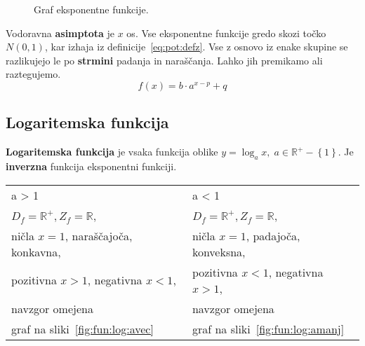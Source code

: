 \documentclass[a4paper,oneside,12pt,fleqn]{article}
\def\R{\ensuremath{\mathbb R}}
\newcommand\krat\cdot
\newcommand{\beforecaptionskip}{\vspace{-12pt}}
\numberwithin{equation}{section}
\begin{document}
\begin{figure}[ht]
  \begin{center}
  \end{center}
  \beforecaptionskip
  \caption{Graf eksponentne funkcije.}
  \label{fig:fun:eks:graf}
\end{figure}

Vodoravna \textbf{asimptota} je $x$ os. Vse eksponentne funkcije gredo skozi točko $N(0,1)$, kar
izhaja iz definicije~\eqref{eq:pot:defz}. Vse z osnovo iz enake skupine se razlikujejo le
po \textbf{strmini} padanja in naraščanja. Lahko jih premikamo ali raztegujemo.
\[ f(x) = b\krat a^{x-p} + q \]

\subsection{Logaritemska funkcija}
\textbf{Logaritemska funkcija} je vsaka funkcija oblike $y = \log_a\!x, \; a \in \R^+ - \left\{ 1
\right\}$.
Je \textbf{inverzna} funkcija eksponentni funkciji.

\begin{tabular}{ll}
  a > 1 & a < 1 \\
  $D_f = \R^+, Z_f = \R$, & $D_f = \R^+, Z_f = \R$, \\
  ničla $x = 1$, naraščajoča, konkavna, & ničla $x = 1$, padajoča, konveksna, \\
  pozitivna $x > 1$, negativna $x < 1$, & pozitivna $x < 1$, negativna $x > 1$, \\
  navzgor omejena & navzgor omejena \\
  graf na sliki~\ref{fig:fun:log:avec} & graf na sliki~\ref{fig:fun:log:amanj}
\end{tabular}
\end{document}
